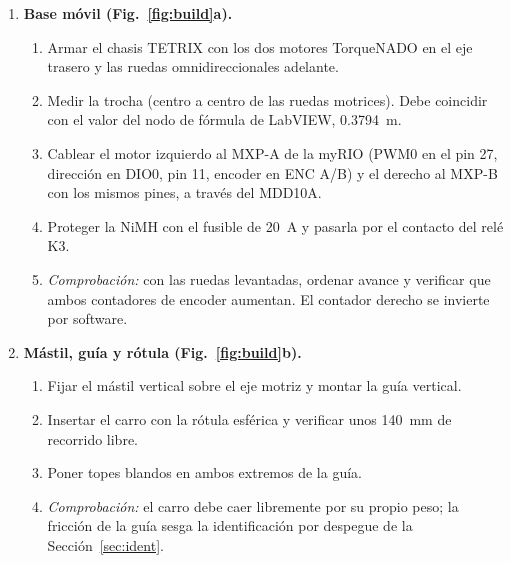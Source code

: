 \begin{enumerate}[label=\textbf{Paso \arabic*.}, leftmargin=*, align=left]
  \item \textbf{Base móvil (Fig.~\ref{fig:build}a).}
  \begin{enumerate}[label=(\alph*)]
    \item Armar el chasis TETRIX con los dos motores TorqueNADO en el eje trasero y las ruedas omnidireccionales adelante.
    \item Medir la trocha (centro a centro de las ruedas motrices). Debe coincidir con el valor del nodo de fórmula de LabVIEW, \SI{0.3794}{\metre}.
    \item Cablear el motor izquierdo al MXP-A de la myRIO (PWM0 en el pin 27, dirección en DIO0, pin 11, encoder en ENC A/B) y el derecho al MXP-B con los mismos pines, a través del MDD10A.
    \item Proteger la NiMH con el fusible de \SI{20}{\ampere} y pasarla por el contacto del relé K3.
    \item \emph{Comprobación:} con las ruedas levantadas, ordenar avance y verificar que ambos contadores de encoder aumentan. El contador derecho se invierte por software.
  \end{enumerate}

  \item \textbf{Mástil, guía y rótula (Fig.~\ref{fig:build}b).}
  \begin{enumerate}[label=(\alph*)]
    \item Fijar el mástil vertical sobre el eje motriz y montar la guía vertical.
    \item Insertar el carro con la rótula esférica y verificar unos \SI{140}{\milli\metre} de recorrido libre.
    \item Poner topes blandos en ambos extremos de la guía.
    \item \emph{Comprobación:} el carro debe caer libremente por su propio peso; la fricción de la guía sesga la identificación por despegue de la Sección~\ref{sec:ident}.
  \end{enumerate}


\end{enumerate}

